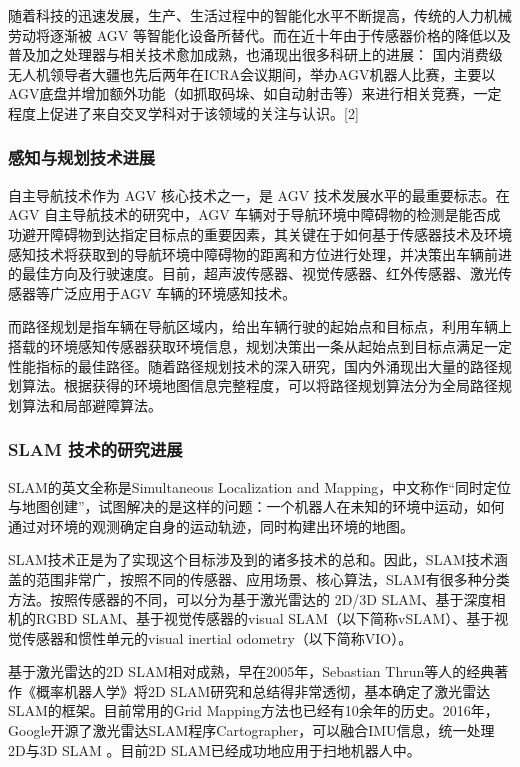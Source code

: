 随着科技的迅速发展，生产、生活过程中的智能化水平不断提高，传统的人力机械劳动将逐渐被 AGV 等智能化设备所替代。而在近十年由于传感器价格的降低以及普及加之处理器与相关技术愈加成熟，也涌现出很多科研上的进展：
国内消费级无人机领导者大疆也先后两年在ICRA会议期间，举办AGV机器人比赛，主要以AGV底盘并增加额外功能（如抓取码垛、如自动射击等）来进行相关竞赛，一定程度上促进了来自交叉学科对于该领域的关注与认识。[2]


\subsubsection{感知与规划技术进展}

自主导航技术作为 AGV 核心技术之一，是 AGV 技术发展水平的最重要标志。在AGV 自主导航技术的研究中，AGV 车辆对于导航环境中障碍物的检测是能否成功避开障碍物到达指定目标点的重要因素，其关键在于如何基于传感器技术及环境感知技术将获取到的导航环境中障碍物的距离和方位进行处理，并决策出车辆前进的最佳方向及行驶速度。目前，超声波传感器、视觉传感器、红外传感器、激光传感器等广泛应用于AGV 车辆的环境感知技术。

而路径规划是指车辆在导航区域内，给出车辆行驶的起始点和目标点，利用车辆上搭载的环境感知传感器获取环境信息，规划决策出一条从起始点到目标点满足一定性能指标的最佳路径。随着路径规划技术的深入研究，国内外涌现出大量的路径规划算法。根据获得的环境地图信息完整程度，可以将路径规划算法分为全局路径规划算法和局部避障算法。 

\subsubsection{SLAM 技术的研究进展}

SLAM的英文全称是Simultaneous Localization and Mapping，中文称作“同时定位与地图创建”，试图解决的是这样的问题：一个机器人在未知的环境中运动，如何通过对环境的观测确定自身的运动轨迹，同时构建出环境的地图。

SLAM技术正是为了实现这个目标涉及到的诸多技术的总和。因此，SLAM技术涵盖的范围非常广，按照不同的传感器、应用场景、核心算法，SLAM有很多种分类方法。按照传感器的不同，可以分为基于激光雷达的 2D/3D SLAM、基于深度相机的RGBD SLAM、基于视觉传感器的visual SLAM（以下简称vSLAM）、基于视觉传感器和惯性单元的visual inertial odometry（以下简称VIO）。

基于激光雷达的2D SLAM相对成熟，早在2005年，Sebastian Thrun等人的经典著作《概率机器人学》将2D SLAM研究和总结得非常透彻，基本确定了激光雷达SLAM的框架。目前常用的Grid Mapping方法也已经有10余年的历史。2016年，Google开源了激光雷达SLAM程序Cartographer，可以融合IMU信息，统一处理2D与3D SLAM 。目前2D SLAM已经成功地应用于扫地机器人中。

